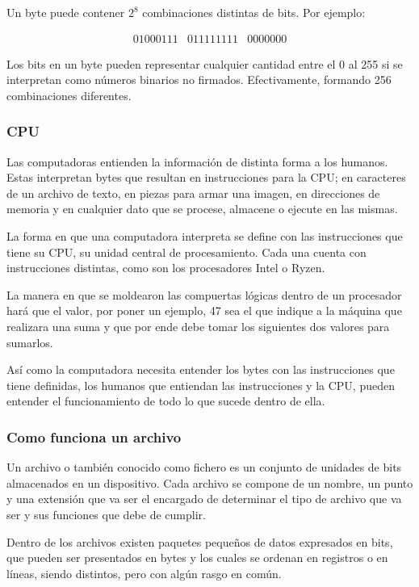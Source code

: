 \documentclass[a4paper]{article}
\begin{document}
\autocite{BYTE}

Un byte puede contener $2^8$ combinaciones distintas de bits. Por ejemplo:

\[
\begin{array}{ccc}
    01000111 & 011111111 & 0000000
\end{array}
\]

Los bits en un byte pueden representar cualquier cantidad entre el 0 al 255 si
se interpretan como números binarios no firmados. Efectivamente, formando 256
combinaciones diferentes.

\subsubsection{CPU}

Las computadoras entienden la información de distinta forma a los humanos.
Estas interpretan bytes que resultan en instrucciones para la CPU; en
caracteres de
un archivo de texto, en piezas para armar una imagen, en direcciones de memoria
y en cualquier dato que se procese, almacene o ejecute en las mismas.

La forma en que una computadora interpreta se define con las instrucciones que
tiene su CPU, su unidad central de procesamiento.
Cada una cuenta con instrucciones distintas, como son los procesadores Intel o
Ryzen.

La manera en que se moldearon las compuertas lógicas dentro de un procesador
hará que el valor, por poner un ejemplo, 47 sea el que
indique a la máquina que realizara una suma y que por ende debe tomar los
siguientes dos valores para sumarlos.

Así como la computadora necesita entender los bytes con las instrucciones que
tiene definidas, los humanos que entiendan las instrucciones
y la CPU, pueden entender el funcionamiento de todo lo que sucede dentro de
ella.

\subsubsection{Como funciona un archivo}

Un archivo o también conocido como fichero es un conjunto de unidades de bits
almacenados en un dispositivo. Cada archivo se compone de un nombre, un punto y
una extensión que va ser el encargado de determinar el tipo de archivo que va
ser y sus funciones que debe de cumplir.


Dentro de los archivos existen paquetes pequeños de datos expresados en bits,
que pueden ser presentados en bytes y los cuales se ordenan en registros o en
líneas, siendo distintos, pero con algún rasgo en común.
\end{document}
